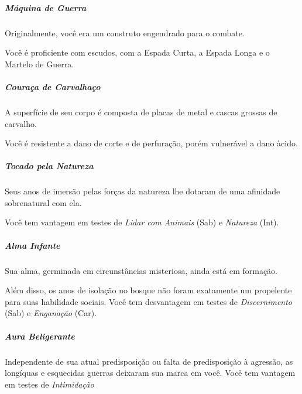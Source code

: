 \documentclass[letterpaper,twocolumn,openany]{dndbook}
\begin{document}
	\subparagraph{Máquina de Guerra}
	Originalmente, você era um construto engendrado para o combate. 
	\par Você é proficiente com escudos, com a Espada Curta, a Espada Longa e o Martelo de Guerra.
	
	\subparagraph{Couraça de Carvalhaço}
	A superfície de seu corpo é composta de placas de metal e cascas grossas de carvalho. 
	\par Você é resistente a dano de corte e de perfuração, porém vulnerável a dano àcido.
	
	\subparagraph{Tocado pela Natureza}
	Seus anos de imersão pelas forças da natureza lhe dotaram de uma afinidade sobrenatural com ela. 
	\par Você tem vantagem em testes de \textit{Lidar com Animais} (Sab) e \textit{Natureza} (Int).
	
	\subparagraph{Alma Infante}
	Sua alma, germinada em circunstâncias misteriosa, ainda está em formação. 
	\par Além disso, os anos de isolação no bosque não foram exatamente um propelente para suas habilidade sociais. Você tem desvantagem em testes de \textit{Discernimento} (Sab) e \textit{Enganação} (Car).
	
	\subparagraph{Aura Beligerante}
	Independente de sua atual predisposição ou falta de predisposição à agressão, as longíquas e esquecidas guerras deixaram sua marca em você. Você tem vantagem em testes de \textit{Intimidação}	
\end{document}
